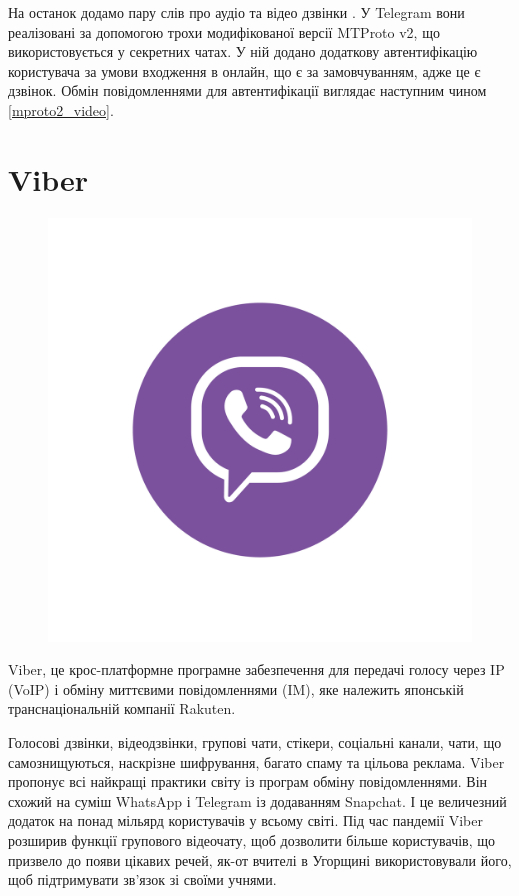На останок додамо пару слів про аудіо та відео дзвінки \cite{telegram_mtproto2_video_calls}. У Telegram вони реалізовані за допомогою трохи модифікованої версії MTProto v2, що використовується у секретних чатах. У ній додано додаткову автентифікацію користувача за умови входження в онлайн, що є за замовчуванням, адже це є дзвінок. Обмін повідомленнями для автентифікації виглядає наступним чином \ref{mproto2_video}.

\section{Viber}

\begin{figure}
    \includegraphics[width=0.9\linewidth]{../IMAGES/viber.png} 
    \label{fig:telegram}
\end{figure}

Viber, це крос-платформне програмне забезпечення для передачі голосу через IP (VoIP) і обміну миттєвими повідомленнями (IM), яке належить японській транснаціональній компанії Rakuten.

Голосові дзвінки, відеодзвінки, групові чати, стікери, соціальні канали, чати, що самознищуються, наскрізне шифрування, багато спаму та цільова реклама. Viber пропонує всі найкращі практики світу із програм обміну повідомленнями. Він схожий на суміш WhatsApp і Telegram із додаванням Snapchat. І це величезний додаток на понад мільярд користувачів у всьому світі. Під час пандемії Viber розширив функції групового відеочату, щоб дозволити більше користувачів, що призвело до появи цікавих речей, як-от вчителі в Угорщині використовували його, щоб підтримувати зв’язок зі своїми учнями. 

